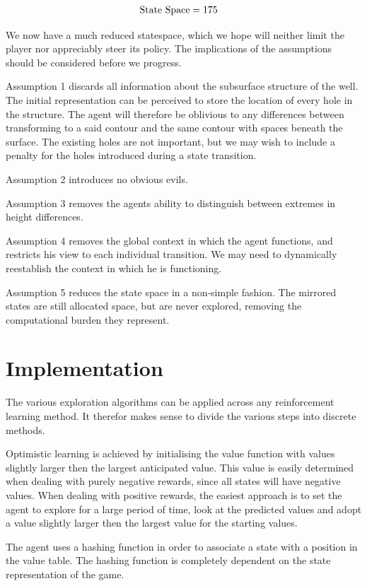 \documentclass{rucsthesis}
\begin{document}
\begin{eqnarray}
\centering
\textrm{State Space} & = 175
\end{eqnarray}

We now have a much reduced statespace, which we hope will neither limit the player nor appreciably steer its policy. The implications of the assumptions should be considered before we progress.

Assumption 1 discards all information about the subsurface structure of the well. The initial representation can be perceived to store the location of every hole in the structure. The agent will therefore be oblivious to any differences between transforming to a said contour and the same contour with spaces beneath the surface. The existing holes are not important, but we may wish to include a penalty for the holes introduced during a state transition.

Assumption 2 introduces no obvious evils.

Assumption 3 removes the agents ability to distinguish between extremes in height differences.

Assumption 4 removes the global context in which the agent functions, and restricts his view to each individual transition. We may need to dynamically reestablish the context in which he is functioning.

Assumption 5 reduces the state space in a non-simple fashion. The mirrored states are still allocated space, but are never explored, removing the computational burden they represent. 


\chapter{Implementation}

The various exploration algorithms can be applied across any reinforcement learning method. It therefor makes sense to divide the various steps into discrete methods.

Optimistic learning is achieved by initialising the value function with values slightly larger then the largest anticipated value. This value is easily determined when dealing with purely negative rewards, since all states will have negative values. When dealing with positive rewards, the easiest approach is to set the agent to explore for a large period of time, look at the predicted values and adopt a value slightly larger then the largest value for the starting values.

The agent uses a hashing function in order to associate a state with a position in the value table. The hashing function is completely dependent on the state representation of the game.
\end{document}
